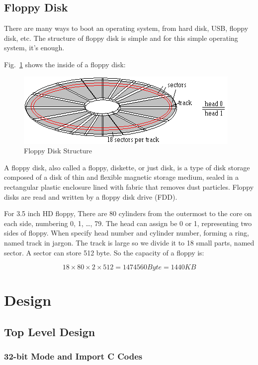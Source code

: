 \documentclass{swfcthesis}
\begin{document}
\section{Floppy Disk}
\label{sec:floppy-disk}

There are many ways to boot an operating system, from hard disk, USB, floppy disk, etc.
The structure of floppy disk is simple and for this simple operating system, it's enough.

Fig.~\ref{fig:flpy1.png} shows the inside of a floppy disk:
\begin{figure}[!ht]
  \centering
  \includegraphics[width=.5\textwidth]{../figs/bootLoader/flpy1.png}
  \caption{Floppy Disk Structure}
  \label{fig:flpy1.png}
\end{figure}

A floppy disk, also called a floppy, diskette, or just disk, is a type of disk storage
composed of a disk of thin and flexible magnetic storage medium, sealed in a rectangular
plastic enclosure lined with fabric that removes dust particles. Floppy disks are read and
written by a floppy disk drive (FDD).

For 3.5 inch HD floppy,  There are 80 cylinders from the outermost to
the core on each side, numbering 0, 1, \ldots, 79. The head can assign be 0 or 1,
representing two sides of floppy. When specify head number and cylinder number, forming a
ring, named track in jargon. The track is large so we divide it to 18 small parts, named
sector. A sector can store 512 byte. So the capacity of a floppy is:

\[18 \times 80 \times 2 \times 512 = 1474560 Byte = 1440 KB\]


\chapter{Design}

\section{Top Level Design}
\label{sec:top-level-design}


\subsection{32-bit Mode and Import C Codes}
\label{sec:32-bit-mode}
\end{document}
